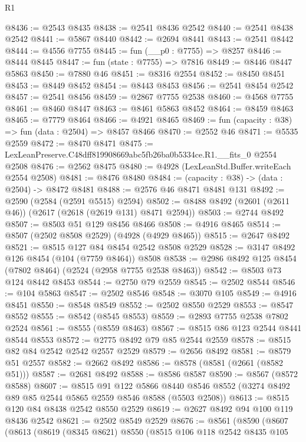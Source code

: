 \begin{lexlean}{R1}
\begin{coremodule}
@8436 := @2543 @8435
@8438 := @2541 @8436 @2542
@8440 := @2541 @8438 @2542
@8441 := @5867 @8440
@8442 := @2694 @8441
@8443 := @2541 @8442
@8444 := @4556 @7755
@8445 := fun (__p0 : @7755) => @8257
@8446 := @8444 @8445
@8447 := fun (state : @7755) => @7816
@8449 := @8446 @8447 @5863
@8450 := @7880 @46
@8451 := @8316 @2554
@8452 := @8450 @8451
@8453 := @8449 @8452
@8454 := @8443 @8453
@8456 := @2541 @8454 @2542
@8457 := @2541 @8456
@8459 := @2867 @7755 @2538
@8460 := @4568 @7755
@8461 := @8460 @8447
@8463 := @8461 @5863 @8452
@8464 := @8459 @8463
@8465 := @7779 @8464
@8466 := @4921 @8465
@8469 := fun (capacity : @38) => fun (data : @2504) => @8457 @8466
@8470 := @2552 @46
@8471 := @5535 @2559
@8472 := @8470 @8471
@8475 := LexLeanPreserve.C48dff819908669abc5fb26ba0b5334ce.R1.__fits_0 @2554 @2508
@8476 := @2562 @8475
@8480 := @4928 (LexLeanStd.Buffer.writeEach @2554 @2508)
@8481 := @8476 @8480
@8484 := (capacity : @38) -> (data : @2504) -> @8472 @8481
@8488 := @2576 @46 @8471 @8481 @131
@8492 := @2590 (@2584 (@2591 @5515) @2594)
@8502 := @8488 @8492 (@2601 (@2611 @46)) (@2617 (@2618 (@2619 @131) @8471 @2594))
@8503 := @2744 @8492
@8507 := @8503 @51 @129 @8456 @8466
@8508 := @4916 @8465
@8514 := @8507 (@2502 @8508 @2529) (@4928 (@4929 @8465))
@8515 := @2647 @8492
@8521 := @8515 @127 @84 @8454 @2542 @8508 @2529
@8528 := @3147 @8492 @126 @8454 (@104 (@7759 @8464)) @8508
@8538 := @2986 @8492 @125 @8454 (@7802 @8464) (@2524 (@2958 @7755 @2538 @8463))
@8542 := @8503 @73 @124 @8442 @8453
@8544 := @2750 @79 @2559
@8545 := @2502 @8544
@8546 := @104 @5863
@8547 := @2502 @8546
@8548 := @3070 @105
@8549 := @4916 @8451
@8550 := @8548 @8549
@8552 := @2502 @8550 @2529
@8553 := @8547 @8552
@8555 := @8542 (@8545 @8553)
@8559 := @2893 @7755 @2538 @7802 @2524
@8561 := @8555 (@8559 @8463)
@8567 := @8515 @86 @123 @2544 @8441 @8544 @8553
@8572 := @2775 @8492 @79 @85 @2544 @2559
@8578 := @8515 @82 @84 @2542 @2542 @2557 @2529
@8579 := @2656 @8492
@8581 := @8579 @51 @2557
@8582 := @2662 @8492
@8586 := @8578 (@8581 (@2661 (@8582 @51)))
@8587 := @2681 @8492
@8588 := @8586 @8587
@8590 := @8567 (@8572 @8588)
@8607 := @8515
    @91
    @122
    @5866
    @8440
    @8546
    @8552
    (@3274 @8492 @89 @85 @2544 @5865 @2559 @8546 @8588 (@5503 @2508))
@8613 := @8515 @120 @84 @8438 @2542 @8550 @2529
@8619 := @2627 @8492 @94 @100 @119 @8436 @2542
@8621 := @2502 @8549 @2529
@8676 := @8561
    (@8590
      (@8607
        (@8613
          (@8619
            (@8345 @8621)
            @8550
            (@8515
              @106
              @118
              @2542
              @8435
              @105

\end{coremodule}
\end{lexlean}
